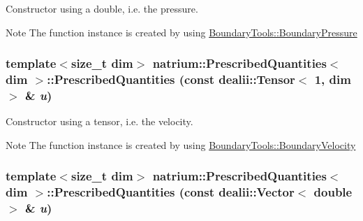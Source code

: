 Constructor using a double, i.e. the pressure. \begin{DoxyNote}{Note}
The function instance is created by using \hyperlink{classnatrium_1_1BoundaryTools_1_1BoundaryPressure}{BoundaryTools::BoundaryPressure} 
\end{DoxyNote}
\hypertarget{classnatrium_1_1PrescribedQuantities_a277c4dcfb5cdfa4f14164df1ca0b01f8}{
\subsubsection[{PrescribedQuantities}]{\setlength{\rightskip}{0pt plus 5cm}template$<$size\_\-t dim$>$ {\bf natrium::PrescribedQuantities}$<$ dim $>$::{\bf PrescribedQuantities} (const dealii::Tensor$<$ 1, dim $>$ \& {\em u})}}
\label{classnatrium_1_1PrescribedQuantities_a277c4dcfb5cdfa4f14164df1ca0b01f8}


Constructor using a tensor, i.e. the velocity. \begin{DoxyNote}{Note}
The function instance is created by using \hyperlink{classnatrium_1_1BoundaryTools_1_1BoundaryVelocity}{BoundaryTools::BoundaryVelocity} 
\end{DoxyNote}
\hypertarget{classnatrium_1_1PrescribedQuantities_af56b9d9bcfb6b49e8163600d62779ef3}{
\subsubsection[{PrescribedQuantities}]{\setlength{\rightskip}{0pt plus 5cm}template$<$size\_\-t dim$>$ {\bf natrium::PrescribedQuantities}$<$ dim $>$::{\bf PrescribedQuantities} (const dealii::Vector$<$ double $>$ \& {\em u})}}
\label{classnatrium_1_1PrescribedQuantities_af56b9d9bcfb6b49e8163600d62779ef3}


